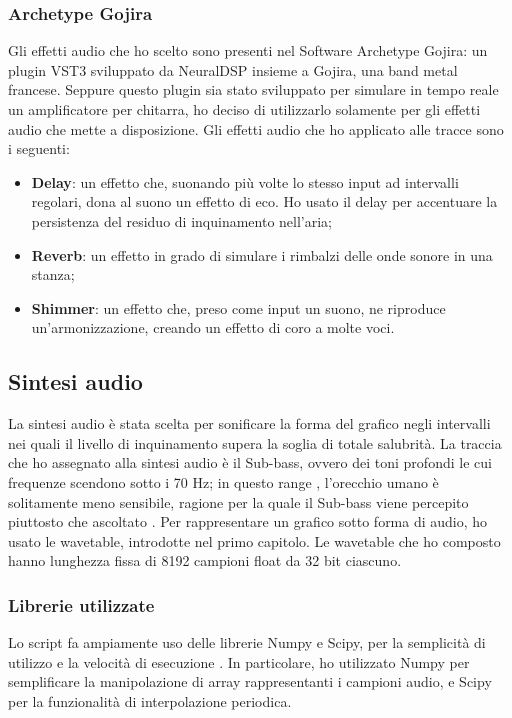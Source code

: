 \subsubsection{Archetype Gojira}
Gli effetti audio che ho scelto sono presenti nel Software Archetype Gojira: un plugin VST3 sviluppato da NeuralDSP insieme a Gojira, una band metal francese.
Seppure questo plugin sia stato sviluppato per simulare in tempo reale un amplificatore per chitarra, ho deciso di utilizzarlo solamente per gli effetti audio che mette a disposizione.
Gli effetti audio che ho applicato alle tracce sono i seguenti:
\begin{itemize}
    \item \textbf{Delay}: un effetto che, suonando più volte lo stesso input ad intervalli regolari, dona al suono un effetto di eco. Ho usato il delay per accentuare la persistenza del residuo di inquinamento nell'aria;
    \item \textbf{Reverb}: un effetto in grado di simulare i rimbalzi delle onde sonore in una stanza;
    \item \textbf{Shimmer}: un effetto che, preso come input un suono, ne riproduce un'armonizzazione, creando un effetto di coro a molte voci.
\end{itemize}

\subsection{Sintesi audio}
La sintesi audio è stata scelta per sonificare la forma del grafico negli intervalli nei quali il livello di inquinamento supera la soglia di totale salubrità.
La traccia che ho assegnato alla sintesi audio è il Sub-bass, ovvero dei toni profondi le cui frequenze scendono sotto i 70 Hz; in questo range , l'orecchio umano è solitamente meno sensibile, ragione per la quale il Sub-bass viene percepito piuttosto che ascoltato \cite{subbass}.
Per rappresentare un grafico sotto forma di audio, ho usato le wavetable, introdotte nel primo capitolo.
Le wavetable che ho composto hanno lunghezza fissa di 8192 campioni float da 32 bit ciascuno.
\subsubsection{Librerie utilizzate}
Lo script fa ampiamente uso delle librerie Numpy e Scipy, per la semplicità di utilizzo e la velocità di esecuzione \cite{numpy}.
In particolare, ho utilizzato Numpy per semplificare la manipolazione di array rappresentanti i campioni audio, e Scipy per la funzionalità di interpolazione periodica.
